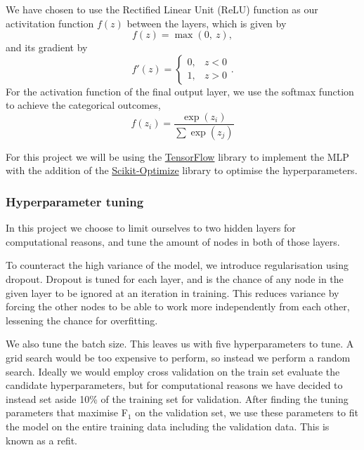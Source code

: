 \documentclass[a4paper, 11pt, twocolumn]{article}
\begin{document}
We have chosen to use the Rectified Linear Unit (ReLU) function as our 
activitation function $f(z)$ between the layers, which is given by 
\begin{equation}
      f(z) = \max (0,\ z),
\end{equation}
and its gradient by 
\begin{equation}
      f'(z) = 
      \begin{cases} 
            0, &  z<0\\
            1, &  z>0
      \end{cases}. 
\end{equation}
For the activation function of the final output layer, we use the softmax 
function to achieve the categorical outcomes,
\begin{equation}
      f(z_i)=\frac{\exp(z_i)}{\sum \exp(z_j)}
\end{equation}

For this project we will be using the \href{https://www.tensorflow.org/}
{TensorFlow} library to implement the MLP with the addition of the 
\href{https://scikit-optimize.github.io/}{Scikit-Optimize} library to optimise 
the hyperparameters.

\subsubsection{Hyperparameter tuning}
In this project we choose to limit ourselves to two hidden layers for computational reasons, and tune 
the amount of nodes in both of those layers. 

To counteract the high variance of the model, we introduce
regularisation using dropout. Dropout is tuned for each
layer, and is the chance of any node in the given layer
to be ignored at an iteration in training. This reduces
variance by forcing the other nodes to be able to work
more independently from each other, lessening the chance
for overfitting.

We also tune the batch size. This leaves us with five 
hyperparameters to tune. A grid search would be too 
expensive to perform, so instead we perform a random 
search. Ideally we would employ cross 
validation on the train set evaluate the candidate 
hyperparameters, but
for computational reasons we have decided to instead
set aside 10\% of the training set for validation.
After finding the tuning parameters that maximise 
F$_1$ on the validation set, we use these parameters to 
fit the model on the entire training data including the 
validation data. This is known as a refit. 
\end{document}
